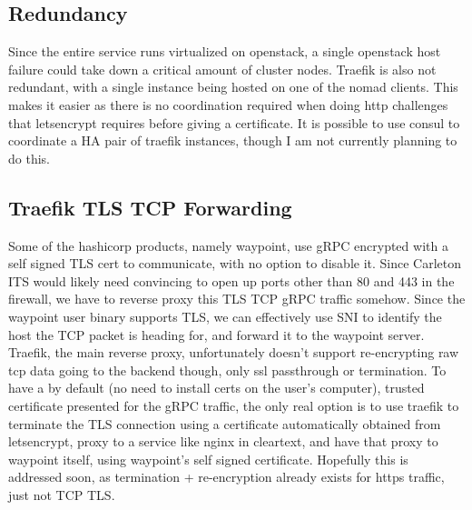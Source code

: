 \documentclass{article}
\begin{document}
\subsection{Redundancy}
Since the entire service runs virtualized on openstack, a single openstack host failure could take down a critical amount of cluster nodes. Traefik is also not redundant, with a single instance being hosted on one of the nomad clients. This makes it easier as there is no coordination required when doing http challenges that letsencrypt requires before giving a certificate. It is possible to use consul to coordinate a HA pair of traefik instances, though I am not currently planning to do this. 
\subsection{Traefik TLS TCP Forwarding}
Some of the hashicorp products, namely waypoint, use gRPC encrypted with a self signed TLS cert to communicate, with no option to disable it. Since Carleton ITS would likely need convincing to open up ports other than 80 and 443 in the firewall, we have to reverse proxy this TLS TCP gRPC traffic somehow. Since the waypoint user binary supports TLS, we can effectively use SNI to identify the host the TCP packet is heading for, and forward it to the waypoint server. Traefik, the main reverse proxy, unfortunately doesn't support re-encrypting raw tcp data going to the backend though, only ssl passthrough or termination. To have a by default (no need to install certs on the user's computer), trusted certificate presented for the gRPC traffic, the only real option is to use traefik to terminate the TLS connection using a certificate automatically obtained from letsencrypt, proxy to a service like nginx in cleartext, and have that proxy to waypoint itself, using waypoint's self signed certificate. Hopefully this is addressed soon, as termination + re-encryption already exists for https traffic, just not TCP TLS. 
\end{document}
